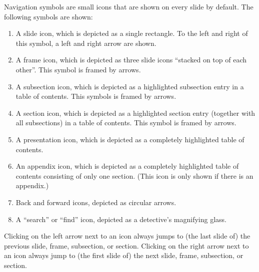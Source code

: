 Navigation symbols are small icons that are shown on every slide
by default. The following symbols are shown: 
\begin{enumerate}
\item
  A slide icon, which is depicted as  a single rectangle. To the left and
  right of this symbol, a left and right arrow are shown.
\item
  A frame icon, which is depicted as three slide icons ``stacked on top of
  each other''. This symbol is framed by arrows.
\item
  A subsection icon, which is depicted as a highlighted subsection
  entry in a table of contents. This  symbols is framed by arrows.
\item
  A section icon, which is depicted as a highlighted section entry
  (together with all subsections) in a table of contents. This symbol
  is framed by arrows.
\item
  A presentation icon, which is depicted as a completely highlighted
  table of contents.
\item
  An appendix icon, which is depicted as a completely highlighted
  table of contents consisting of only one section. (This icon is only
  shown if there is an appendix.)
\item
  Back and forward icons, depicted as circular arrows.
\item
  A ``search'' or ``find'' icon, depicted as a detective's
  magnifying glass.
\end{enumerate}

Clicking on the left arrow next to an icon always jumps to (the
last slide of) the previous slide, frame, subsection, or
section. Clicking on the right arrow next to an icon always jump to
(the first slide of) the next slide, frame, subsection, or section. 

